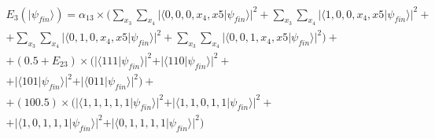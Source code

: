 \begin{equation}
\begin{split}
E_{3}(\vert\psi_{fin}\rangle)=\alpha_{13}\times(\sum_{x_{3}}\sum_{x_{4}}\vert\langle0,0,0,x_{4},x{5}\vert\psi_{fin}\rangle\vert^{2} + \sum_{x_{3}}\sum_{x_{4}}\vert\langle1,0,0,x_{4},x{5}\vert\psi_{fin}\rangle\vert^{2} + \\ 
+ \sum_{x_{3}}\sum_{x_{4}}\vert\langle0,1,0,x_{4},x{5}\vert\psi_{fin}\rangle\vert^{2}
+ \sum_{x_{3}}\sum_{x_{4}}\vert\langle0,0,1,x_{4},x{5}\vert\psi_{fin}\rangle\vert^{2}
 ) + \\
 + (0.5 + E_{23})\times(\vert\langle111\vert\psi_{fin}\rangle\vert^{2} + \vert\langle110\vert\psi_{fin}\rangle\vert^{2} + \\ 
+ \vert\langle101\vert\psi_{fin}\rangle\vert^{2}
+ \vert\langle011\vert\psi_{fin}\rangle\vert^{2}
 ) + \\
 + (100.5)\times(\vert\langle1,1,1,1,1\vert\psi_{fin}\rangle\vert^{2} + \vert\langle1,1,0,1,1\vert\psi_{fin}\rangle\vert^{2} + \\ 
+ \vert\langle1,0,1,1,1\vert\psi_{fin}\rangle\vert^{2}
+ \vert\langle0,1,1,1,1\vert\psi_{fin}\rangle\vert^{2}
 )
\end{split}
\label{eq:pirates_payoff32:3}
\end{equation}


